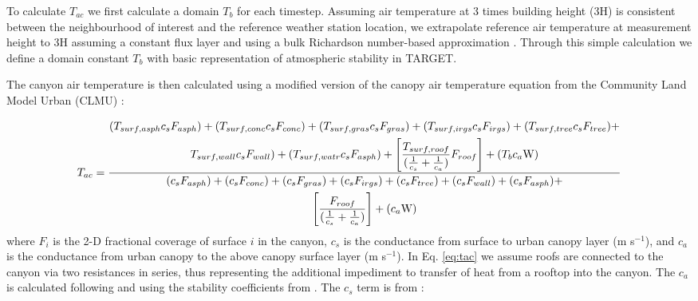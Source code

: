 \documentclass[gmd, manuscript]{copernicus}
\begin{document}
To calculate $T_{ac}$ we first calculate a domain \ensuremath{T_{b}} for each timestep. Assuming air temperature at 3 times building height (3H) is consistent between the neighbourhood of interest and the reference weather station location, we extrapolate reference air temperature at measurement height to 3H assuming a constant flux layer and using a bulk Richardson number-based approximation \citep{Mascart1995}. Through this simple calculation we define a domain constant \ensuremath{T_{b}} with basic representation of atmospheric stability in TARGET.  

The canyon air temperature is then calculated using a modified version of the canopy air temperature equation from the Community Land Model Urban (CLMU) \citep{Oleson2010}:

\begin{equation}
 \label{eq:tac}
  T_{ac} = 
  \frac{\begin{gathered} (T_{surf,asph} \ensuremath{c_{s}} F_{asph}) +  (T_{surf,conc} \ensuremath{c_{s}} F_{conc}) +  (T_{surf,gras} \ensuremath{c_{s}} F_{gras}) + (T_{surf,irgs} \ensuremath{c_{s}} F_{irgs}) + (T_{surf,tree} \ensuremath{c_{s}} F_{tree})  + \\ T_{surf,wall} \ensuremath{c_{s}} F_{wall}) +   (T_{surf,watr} \ensuremath{c_{s}} F_{asph}) +  \Bigg[\frac{T_{surf,roof}}  {(\frac{1}{\ensuremath{c_{s}}}+\frac{1}{\ensuremath{c_{a}}})} F_{roof}\Bigg] + (\ensuremath{T_{b}} \ensuremath{c_{a}} $W$)\end{gathered}}{\begin{gathered} 
      (\ensuremath{c_{s}} F_{asph}) +   (\ensuremath{c_{s}} F_{conc}) +  ( \ensuremath{c_{s}} F_{gras}) + ( \ensuremath{c_{s}} F_{irgs}) + ( \ensuremath{c_{s}} F_{tree})  +  (\ensuremath{c_{s}} F_{wall}) +   (\ensuremath{c_{s}} F_{asph}) + \\ \Bigg[\frac{F_{roof}}{(\frac{1}{\ensuremath{c_{s}}}+\frac{1}{\ensuremath{c_{a}}})}\Bigg] +(\ensuremath{c_{a}} $W$) \end{gathered}}
\end{equation} where $F_{i} $ is the 2-D fractional coverage of surface $i$ in the canyon,  \ensuremath{c_{s}} is the conductance from surface to urban canopy layer (m s$^{-1}$), and \ensuremath{c_{a}} is the conductance from urban canopy to the above canopy surface layer (m s$^{-1}$).
In Eq. \ref{eq:tac} we assume roofs are connected to the canyon via two resistances in series, thus representing the  additional impediment to transfer of heat from a rooftop into the canyon.  The \ensuremath{c_{a}} is calculated following \cite{Masson2000} and using the stability coefficients from \cite{Mascart1995}. %
The \ensuremath{c_{s}} term is from \cite{Masson2000}:
\end{document}
